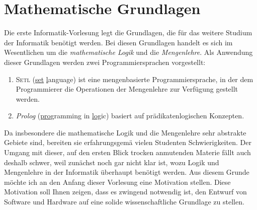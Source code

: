 \chapter{Mathematische Grundlagen} 
Die erste Informatik-Vorlesung legt die Grundlagen, die f\"{u}r das weitere Studium
der Informatik ben\"{o}tigt werden.  Bei diesen Grundlagen handelt es sich im Wesentlichen
um die \emph{mathematische Logik} und die \emph{Mengenlehre}.  
Als Anwendung dieser Grundlagen werden zwei Programmiersprachen vorgestellt:
\begin{enumerate}
\item \textsc{Setl} (\underline{set} \underline{l}anguage) ist eine mengenbasierte
      Programmiersprache, in der dem Programmierer 
      die Operationen der Mengenlehre zur Verf\"{u}gung gestellt werden.
\item \textsl{Prolog} (\underline{pro}gramming in \underline{log}ic) basiert
      auf pr\"{a}dikatenlogischen Konzepten.
\end{enumerate}
Da insbesondere die mathematische Logik und die
Mengenlehre sehr abstrakte Gebiete sind, bereiten sie erfahrungsgem\"{a}\3 vielen Studenten
Schwierigkeiten.  Der Umgang mit dieser, auf den ersten Blick trocken anmutenden Materie f\"{a}llt
auch deshalb schwer, weil zun\"{a}chst noch gar nicht klar ist, wozu Logik und Mengenlehre in der
Informatik \"{u}berhaupt ben\"{o}tigt werden.  Aus diesem Grunde m\"{o}chte ich an den Anfang dieser
Vorlesung eine Motivation stellen. Diese Motivation soll Ihnen zeigen, dass es zwingend
notwendig ist, den Entwurf von Software und Hardware auf eine solide wissenschaftliche
Grundlage zu stellen. 


